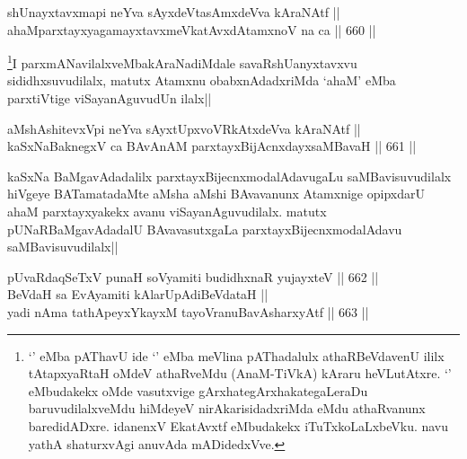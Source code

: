 
\begin{shl}
shUnayxtavxmapi neYva sAyxdeVtasAmxdeVva kAraNAtf || \\
ahaMparxtayxyagamayxtavxmeVkatAvxdAtamxnoV na ca ||  660 ||  
\end{shl}	


\begin{artha}
\footnote{`\stext' eMba pAThavU ide `\stext' eMba meVlina pAThadalulx athaRBeVdavenU ililx tAtapxyaRtaH oMdeV athaRveMdu (AnaM-TiVkA) kAraru heVLutAtxre. `\stext' eMbudakekx oMde vasutxvige gArxhategArxhakategaLeraDu baruvudilalxveMdu hiMdeyeV nirAkarisidadxriMda eMdu athaRvanunx baredidADxre. idanenxV EkatAvxtf eMbudakekx iTuTxkoLaLxbeVku. navu yathA shaturxvAgi anuvAda mADidedxVve.}I parxmANavilalxveMbakAraNadiMdale savaRshUanyxtavxvu sididhxsuvudilalx, matutx Atamxnu obabxnAdadxriMda `ahaM' eMba parxtiVtige viSayanAguvudUn ilalx||
\end{artha}

\begin{shl}
aMshAshitevxV\s pi neYva sAyxtUpxvoVRkAtxdeVva kAraNAtf || \\
kaSxNaBaknegxV ca BAvAnAM parxtayxBijAcnxdayxsaMBavaH ||  661 ||  
\end{shl}

\begin{artha}
kaSxNa BaMgavAdadalilx parxtayxBijecnxmodalAdavugaLu saMBavisuvudilalx hiVgeye BATamatadaMte aMsha aMshi BAvavanunx Atamxnige opipxdarU ahaM parxtayxyakekx avanu viSayanAguvudilalx. matutx pUNaRBaMgavAdadalU BAvavasutxgaLa parxtayxBijecnxmodalAdavu saMBavisuvudilalx||
\end{artha}

\begin{shl}
pUvaRdaqSeTxV punaH soV\s yamiti budidhxnaR yujayxteV ||  662 ||  \\
BeVdaH sa EvAyamiti kAlarUpAdiBeVdataH || \\
yadi nAma tathA\s peyxYkayxM tayoVranuBavAsharxyAtf ||  663 ||  
\end{shl}

